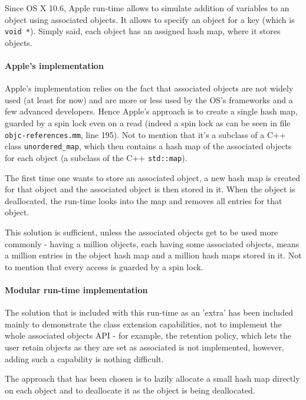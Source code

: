 Since OS X 10.6, Apple run-time allows to simulate addition of variables to an object using associated objects\cite{associated_objects}. It allows to specify an object for a key (which is \verb=void *=). Simply said, each object has an assigned hash map, where it stores objects.

\paragraph{Apple's implementation}

Apple's implementation relies on the fact that associated objects are not widely used (at least for now) and are more or less used by the OS's frameworks and a few advanced developers. Hence Apple's approach is to create a single hash map, guarded by a spin lock even on a read (indeed a spin lock as can be seen in file \verb=objc-references.mm=, line 195). Not to mention that it's a subclass of a C++ class \verb=unordered_map=, which then contains a hash map of the associated objects for each object (a subclass of the C++ \verb=std::map=). 

The first time one wants to store an associated object, a new hash map is created for that object and the associated object is then stored in it. When the object is deallocated, the run-time looks into the map and removes all entries for that object.

This solution is sufficient, unless the associated objects get to be used more commonly - having a million objects, each having some associated objects, means a million entries in the object hash map and a million hash maps stored in it. Not to mention that every access is guarded by a spin lock.

\paragraph{Modular run-time implementation}

The solution that is included with this run-time as an 'extra' has been included mainly to demonstrate the class extension capabilities, not to implement the whole associated objects API - for example, the retention policy, which lets the user retain objects as they are set as associated is not implemented, however, adding such a capability is nothing difficult.

The approach that has been chosen is to lazily allocate a small hash map directly on each object and to deallocate it as the object is being deallocated.

